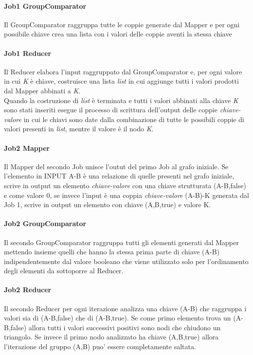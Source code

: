 \documentclass[paper=a4, fontsize=11pt]{scrartcl}	%
\numberwithin{equation}{section}															%
\numberwithin{figure}{section}																%
\numberwithin{table}{section}																%
\begin{document}
\paragraph{Job1 GroupComparator}
Il GroupComparator raggruppa tutte le coppie generate dal Mapper e per ogni possibile chiave crea una lista con i valori delle coppie aventi la stessa chiave
\paragraph{Job1 Reducer}

Il Reducer elabora l'input raggruppato dal GroupComparator e, per ogni valore in cui \textit{K} è chiave, costruisce una lista \textit{list} in cui aggiunge tutti i valori prodotti dal Mapper abbinati a \textit{K}.\\
Quando la costruzione di \textit{list} è terminata e tutti i valori abbinati alla chiave \textit{K} sono stati inseriti esegue il processo di scrittura dell'output delle coppie \textit{chiave-valore} in cui le chiavi sono date dalla combinazione di tutte le possibili coppie di valori presenti in \textit{list}, mentre il valore è il nodo \textit{K}.

\paragraph{Job2 Mapper}
Il Mapper del secondo Job unisce l'outut del primo Job al grafo iniziale. Se l'elemento in INPUT A-B è una relazione di quelle presenti nel grafo iniziale, scrive in output un elemento \textit{chiave-valore} con una chiave strutturata (A-B,false) e come valore 0, se invece l'input è una coppia \textit{chiave-valore} (A-B)-K generata dal Job 1, scrive in output un elemento con chiave (A,B,true) e valore K.
\paragraph{Job2 GroupComparator}
Il secondo GroupComparator raggruppa tutti gli elementi generati dal Mapper mettendo insieme quelli che hanno la stessa prima parte di chiave (A-B) indipendentemente dal valore booleano che viene utilizzato solo per l'ordinamento degli elementi da sottoporre al Reducer.

\paragraph{Job2 Reducer}
Il secondo Reducer per ogni iterazione analizza una chiave (A-B) che raggruppa i valori sia di (A-B,false) che di (A-B,true). Se come primo elemento trova un (A-B,false) allora tutti i valori successivi positivi sono nodi che chiudono un triangolo. Se invece il primo nodo analizzato ha chiave (A,B,true) allora l'iterazione del gruppo (A,B) puo' essere completamente saltata.
\end{document}
